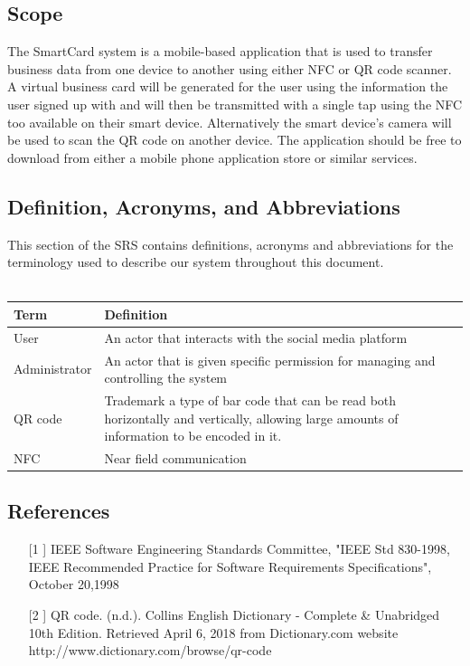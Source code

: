 \documentclass[english]{article}
\begin{document}
		\subsection{Scope}
The SmartCard system is a mobile-based application that is used to transfer business data from one device to another using either NFC or QR code scanner. A virtual business card will be generated for the user using the information the user signed up with and will then be transmitted with a single tap using the NFC too available on their smart device. Alternatively the smart device’s camera will be used to scan the QR code on another device. The application should be free to download from either a mobile phone application store or similar services. 


		\subsection{Definition, Acronyms, and Abbreviations}
				This section of the SRS contains definitions, acronyms and abbreviations for the terminology used to describe our system throughout this document.
				\\
				\\
				\begin{tabular}{ |p{3cm}|p{9cm}|  }
				\hline
				\textbf{Term} & \textbf{Definition}\\
				\hline
				User & An actor that interacts with the social media platform\\
				\hline
				Administrator & An actor that is given specific permission for managing and controlling the system\\
				\hline
				QR code & Trademark a type of bar code that can be read both horizontally and vertically, allowing large amounts of information to be encoded in it.\\
				\hline
				NFC & Near field communication \\
				\hline
				\end{tabular}


		\subsection{References}
\begin{itemize}
			\item [[1]] IEEE Software Engineering Standards Committee, "IEEE Std 830-1998, IEEE Recommended Practice for Software Requirements Specifications", October 20,1998 \\
			\item [[2]] QR code. (n.d.). Collins English Dictionary - Complete \& Unabridged 10th Edition. Retrieved April 6, 2018 from Dictionary.com website http://www.dictionary.com/browse/qr-code
		
		\end{itemize}
\end{document}
